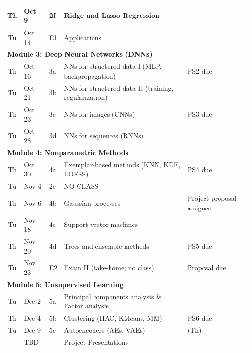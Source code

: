 \documentclass[11pt,twoside]{article}
\numberwithin{equation}{section}
\newcommand{\?}{\stackrel{?}{=}}
\begin{document}
\begin{table}[h!]
\begin{tabular}{cllll}
Th       & Oct 9     & 2f      & Ridge and Lasso Regression                      &                             \\
\midrule
Tu     & Oct 14    & E1      & Applications                          &    \\%
\midrule
\multicolumn{4}{l}{\bf Module 3: Deep Neural Networks (DNNs)}                                                    \\\midrule
Th       & Oct 16    & 3a      & NNs for structured data I (MLP, backpropagation)             & PS2 due                             \\
Tu       & Oct 21    & 3b      & NNs for structured data II (training, regularization) &                                \\
Th       & Oct 23    & 3c      & NNs for images (CNNs)                                 &  PS3 due                              \\
Tu       & Oct 28    & 3d      & NNs for sequences (RNNs)                              &           \\
\midrule
\multicolumn{4}{l}{\bf Module 4:  Nonparametric Methods}                                                                  \\\midrule
Th       & Oct 30    & 4a      & Exemplar-based methods (KNN, KDE, LOESS)              &  PS4 due      \\
Tu       & Nov 4    & 2c      & NO CLASS                          &                     \\ 
Th       & Nov 6     & 4b      & Gaussian processes                                    & Project proposal assigned                               \\
Tu       & Nov 18    & 4c      & Support vector machines                               &                                \\
Th       & Nov 20    & 4d      & Trees and ensemble methods                            &   PS5 due            \\
\midrule
Tu       & Nov 23    &  E2     &  Exam II (take-home; no class)                        &    Proposal due\\%
\midrule
\multicolumn{4}{l}{\bf Module 5: Unsupervised Learning}                                                               \\\midrule
Tu       & Dec 2     & 5a      & Principal components analysis \& Factor analysis                   &                                \\ 
Th       & Dec 4     & 5b      &  Clustering (HAC, KMeans, MM)                                  &                  PS6 due              \\
Tu       & Dec 9     & 5c      &  Autoencoders (AEs, VAEs)                             &     (Th)                    \\ \midrule
       & TBD    &         &  Project Presentations                         &                         \\ 
\bottomrule
\end{tabular}

\end{table}
 
\end{document}
